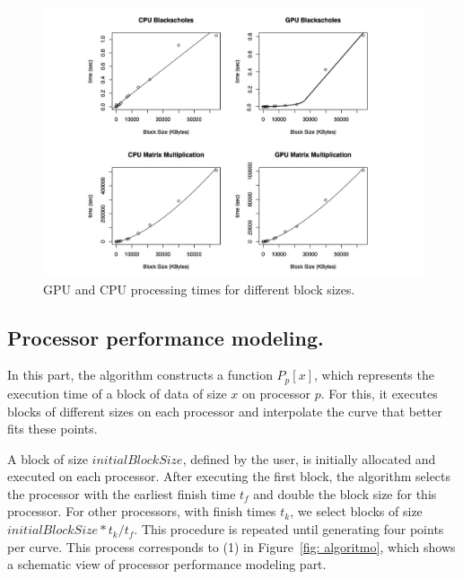 \documentclass[journal]{IEEEtran}
\begin{document}
\begin{figure}[!t]
	\centering
			\includegraphics[scale=0.36]{CPUVersusGPULinear2.pdf} 				
	\caption{GPU and CPU processing times for different block sizes.}
	\label{fig: CPUVersusGPU1}
\end{figure}


\vspace{0.2cm}
\subsection{Processor performance modeling.}
In this part, the algorithm 
constructs a function $P_p[x]$, which represents the execution time of a block
of data of size $x$ on processor $p$. For this, it executes blocks of different
sizes on each processor and interpolate the curve that better fits these points.

A block of size $initialBlockSize$, defined by the user, is initially allocated
and executed on each processor. After executing the first block, the algorithm
selects the processor with the earliest finish time $t_f$ and double the block
size for this processor. For other processors, with finish times $t_k$, we
select blocks of size $initialBlockSize * t_k / t_f$. This procedure is repeated
until generating four points per curve. This process corresponds to (1) in
Figure~\ref{fig: algoritmo}, which shows a schematic view of processor
performance modeling part.
\end{document}
